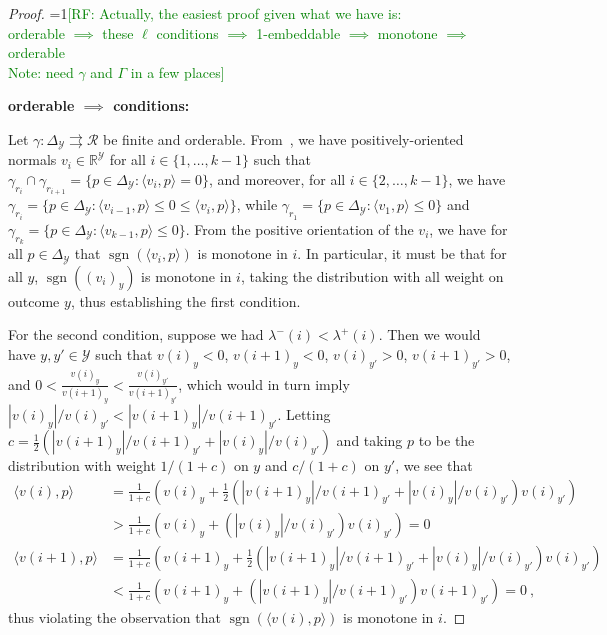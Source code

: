 \documentclass[anon]{colt2020} %
\newcommand{\Comments}{1}
\newcommand{\mynote}[2]{\ifnum\Comments=1\textcolor{#1}{#2}\fi}
\newcommand{\mytodo}[2]{\ifnum\Comments=1%
	\todo[linecolor=#1!80!black,backgroundcolor=#1,bordercolor=#1!80!black]{#2}\fi}
\newcommand{\raf}[1]{\mynote{green}{[RF: #1]}}
\newcommand{\raft}[1]{\mytodo{green!20!white}{RF: #1}}
\newcommand{\reals}{\mathbb{R}}
\newcommand{\simplex}{\Delta_\Y}
\newcommand{\R}{\mathcal{R}}
\newcommand{\Y}{\mathcal{Y}}
\newcommand{\inprod}[2]{\langle #1, #2 \rangle}%
\newcommand{\toto}{\rightrightarrows}
\newcommand{\ones}{\mathbbm{1}}
\DeclareMathOperator*{\sgn}{sgn}
\begin{document}
\begin{proof}
  \raf{Actually, the easiest proof given what we have is:
    \\
  orderable
  $\implies$
  these $\ell$ conditions
  $\implies$
  1-embeddable
  $\implies$
  monotone
  $\implies$
  orderable
  \\
  Note: need $\gamma$ and $\Gamma$ in a few places}

  \noindent\textbf{orderable $\implies$ conditions:}

  Let $\gamma:\simplex\toto\R$ be finite and orderable.
  From~\cite[Theorem 4]{lambert2018elicitation}, we have positively-oriented normals $v_i\in\reals^\Y$ for all $i \in \{1,\ldots,k-1\}$ such that $\gamma_{r_i} \cap \gamma_{r_{i+1}} = \{p\in\simplex : \inprod{v_i}{p} = 0\}$, and moreover, for all $i \in \{2,\ldots,k-1\}$, we have $\gamma_{r_i} = \{p\in\simplex : \inprod{v_{i-1}}{p} \leq 0 \leq \inprod{v_i}{p}\}$, while $\gamma_{r_1} = \{p\in\simplex : \inprod{v_1}{p} \leq 0\}$ and $\gamma_{r_k} = \{p\in\simplex : \inprod{v_{k-1}}{p} \leq 0\}$.
  From the positive orientation of the $v_i$, we have for all $p\in\simplex$ that $\sgn(\inprod{v_i}{p})$ is monotone in $i$.
  In particular, it must be that for all $y$, $\sgn((v_i)_y)$ is monotone in $i$, taking the distribution with all weight on outcome $y$, thus establishing the first condition.

  For the second condition, suppose we had $\lambda^-(i) < \lambda^+(i)$.
  Then we would have $y,y' \in \Y$ such that $v(i)_y < 0$, $v({i+1})_y < 0$, $v(i)_{y'} >0$, $v({i+1})_{y'} > 0$, and $0 < \frac{v(i)_y}{v({i+1})_y} < \frac{v(i)_{y'}}{v({i+1})_{y'}}$, which would in turn imply $|v(i)_y|/v(i)_{y'} < |v(i+1)_y| / v(i+1)_{y'}$.
  Letting $c = \tfrac 1 2 \left(|v(i+1)_y| / v(i+1)_{y'} + |v(i)_y|/v(i)_{y'}\right)$ and taking $p$ to be the distribution with weight $1/(1+c)$ on $y$ and $c/(1+c)$ on $y'$, we see that
  \begin{align*}
    \inprod{v(i)}{p} &= \frac 1 {1+c} \left(v(i)_y + \tfrac 1 2 (|v(i+1)_y| / v(i+1)_{y'} + |v(i)_y|/v(i)_{y'})v(i)_{y'}\right)
    \\ &> \frac 1 {1+c} \left(v(i)_y + (|v(i)_y|/v(i)_{y'})v(i)_{y'}\right) = 0
    \\
    \inprod{v(i+1)}{p} &= \frac 1 {1+c} \left(v(i+1)_y + \tfrac 1 2 (|v(i+1)_y| / v(i+1)_{y'} + |v(i)_y|/v(i)_{y'})v(i)_{y'}\right)
    \\ &< \frac 1 {1+c} \left(v(i+1)_y + (|v(i+1)_y|/v(i+1)_{y'})v(i+1)_{y'}\right) = 0~,
  \end{align*}
  thus violating the observation that $\sgn(\inprod{v(i)}{p})$ is monotone in $i$.


\end{proof}
\end{document}
